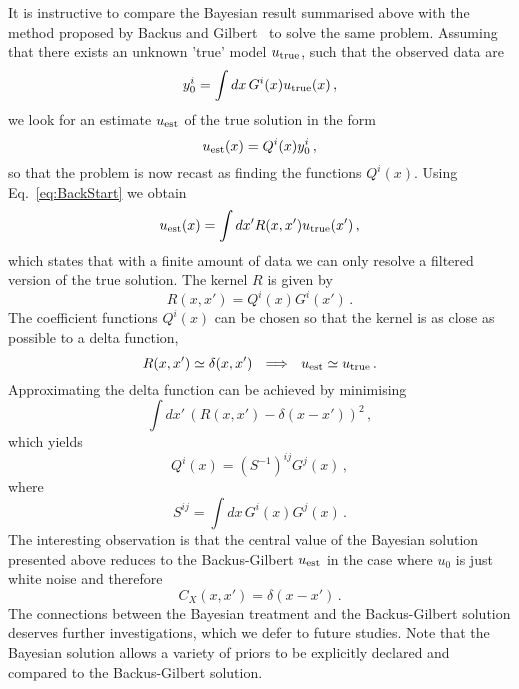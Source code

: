 It is instructive to compare the Bayesian result summarised above with the
method proposed by Backus and Gilbert~\cite{BackusGilbert1968} to solve the same
problem. Assuming that there exists an unknown 'true' model $u_\mathrm{true}$, such that
the observed data are
\begin{equation}
  \label{eq:BackStart}
  y_0^i = \int dx\, G^i(x) u_\mathrm{true}(x)\, ,
\end{equation}
we look for an estimate $u_\mathrm{est}$ of the true solution in the form
\begin{equation}
  \label{eq:BackAnsatz}
  u_\mathrm{est}(x) = Q^i(x) y^i_0\, ,
\end{equation}
so that the problem is now recast as finding the functions $Q^i(x)$.
Using Eq.~\ref{eq:BackStart} we obtain
\begin{equation}
  \label{eq:BackFilter}
  u_\mathrm{est}(x) = \int dx' R(x,x') u_\mathrm{true}(x')\, , 
\end{equation}
which states that with a finite amount of data we can only resolve a filtered
version of the true solution. The kernel $R$ is given by
\begin{equation}
  \label{eq:BackKernel}
  R(x,x') = Q^i(x) G^i(x')\, .
\end{equation}
The coefficient functions $Q^i(x)$ can be chosen so that the kernel is as close as possible
to a delta function,
\begin{equation}
  \label{eq:BackDelta}
  R(x,x') \simeq \delta(x,x') ~~ \Longrightarrow ~~
  u_\mathrm{est} \simeq u_\mathrm{true}\, .
\end{equation}
Approximating the delta function can be achieved by minimising 
\begin{equation}
  \label{eq:BackDeltaness}
  \int dx'\, \left(
    R(x,x') - \delta(x-x')
  \right)^2\, ,
\end{equation}
which yields
\begin{equation}
  \label{eq:BackSolution}
  Q^i(x) = \left(S^{-1}\right)^{ij} G^j(x)\, ,
\end{equation}
where 
\begin{equation}
  \label{eq:BackSMatrix}
  S^{ij} = \int dx\, G^i(x) G^j(x)\, .
\end{equation}
The interesting observation is that the central value of the Bayesian solution
presented above reduces to the Backus-Gilbert $u_\mathrm{est}$ in the case where $u_0$ 
is just white noise and therefore
\begin{equation}
  \label{eq:BackComparison}
  C_{X}(x,x') = \delta(x-x')\, .
\end{equation}
The connections between the Bayesian treatment and the Backus-Gilbert solution
deserves further investigations, which we defer to future studies. Note that the
Bayesian solution allows a variety of priors to be explicitly declared and
compared to the Backus-Gilbert solution. 